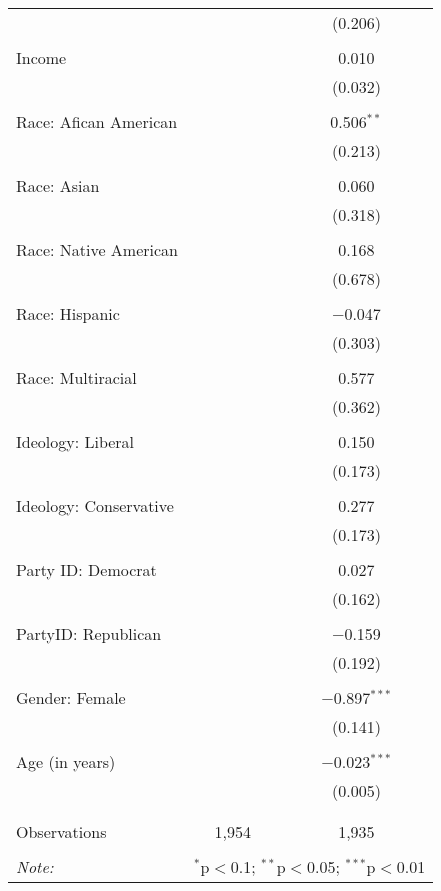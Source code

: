 \begin{table}[!htbp]
\begin{tabular}{@{\extracolsep{5pt}}lcc}
  &  & (0.206) \\ 
  & & \\ 
 Income &  & 0.010 \\ 
  &  & (0.032) \\ 
  & & \\ 
 Race: Afican American &  & 0.506$^{**}$ \\ 
  &  & (0.213) \\ 
  & & \\ 
 Race: Asian &  & 0.060 \\ 
  &  & (0.318) \\ 
  & & \\ 
 Race: Native American &  & 0.168 \\ 
  &  & (0.678) \\ 
  & & \\ 
 Race: Hispanic &  & $-$0.047 \\ 
  &  & (0.303) \\ 
  & & \\ 
 Race: Multiracial &  & 0.577 \\ 
  &  & (0.362) \\ 
  & & \\ 
 Ideology: Liberal &  & 0.150 \\ 
  &  & (0.173) \\ 
  & & \\ 
 Ideology: Conservative &  & 0.277 \\ 
  &  & (0.173) \\ 
  & & \\ 
 Party ID: Democrat &  & 0.027 \\ 
  &  & (0.162) \\ 
  & & \\ 
 PartyID: Republican &  & $-$0.159 \\ 
  &  & (0.192) \\ 
  & & \\ 
 Gender: Female &  & $-$0.897$^{***}$ \\ 
  &  & (0.141) \\ 
  & & \\ 
 Age (in years) &  & $-$0.023$^{***}$ \\ 
  &  & (0.005) \\ 
  & & \\ 
\hline \\[-1.8ex] 
Observations & 1,954 & 1,935 \\ 
\hline 
\hline \\[-1.8ex] 
\textit{Note:}  & \multicolumn{2}{r}{$^{*}$p$<$0.1; $^{**}$p$<$0.05; $^{***}$p$<$0.01} \\ 
\end{tabular} 
\end{table} 
